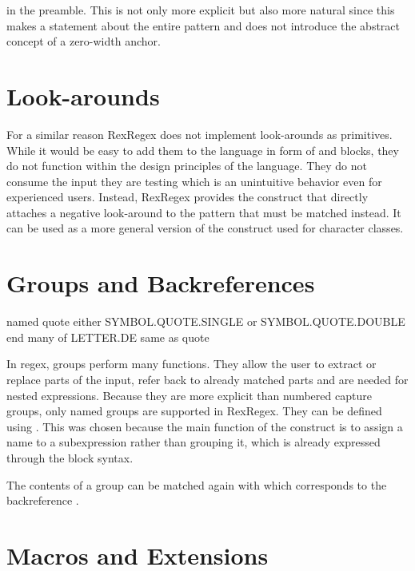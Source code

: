 in the preamble. This is not only more explicit but also more natural since this makes a statement about the entire pattern and does not introduce the abstract concept of a zero-width anchor.

\section{Look-arounds}

For a similar reason RexRegex does not implement look-arounds as primitives. While it would be easy to add them to the language in form of  and  blocks, they do not function within the design principles of the language. They do not consume the input they are testing which is an unintuitive behavior even for experienced users. Instead, RexRegex provides the  construct that directly attaches a negative look-around to the pattern that must be matched instead. It can be used as a more general version of the  construct used for character classes.

\section{Groups and Backreferences}

\begin{rexregexBox}[label=code:dslGroupsAndBackrefs,title=Groups and Backreferences in RexRegex]
named quote
    either SYMBOL.QUOTE.SINGLE or SYMBOL.QUOTE.DOUBLE
end
many of LETTER.DE
same as quote
\end{rexregexBox}

In regex, groups perform many functions. They allow the user to extract or replace parts of the input, refer back to already matched parts and are needed for nested expressions. Because they are more explicit than numbered capture groups, only named groups are supported in RexRegex. They can be defined using . This was chosen because the main function of the construct is to assign a name to a subexpression rather than grouping it, which is already expressed through the block syntax.

The contents of a group can be matched again with  which corresponds to the backreference . 

\section{Macros and Extensions} \label{sec:macros}

